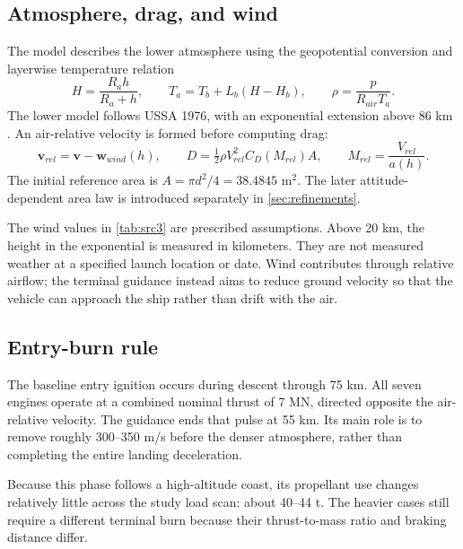 \documentclass[11pt,a4paper]{article}
\newcommand{\vect}[1]{\bm{#1}}
\begin{document}
\subsection{Atmosphere, drag, and wind}
The model describes the lower atmosphere using the geopotential conversion and layerwise temperature relation
\begin{equation}
 H=\frac{R_ah}{R_a+h},\qquad
 T_a=T_b+L_b(H-H_b),\qquad \rho=\frac{p}{R_{air}T_a}.
\label{eq:atmo}
\end{equation}
The lower model follows USSA 1976, with an exponential extension above 86 km \cite{ussa}. An air-relative velocity is formed before computing drag:
\begin{equation}
 \vect v_{rel}=\vect v-\vect w_{wind}(h),\qquad
 D=\tfrac12\rho V_{rel}^2C_D(M_{rel})A,\qquad
 M_{rel}=\frac{V_{rel}}{a(h)}.
\end{equation}
The initial reference area is $A=\pi d^2/4=38.4845$ m$^2$. The later attitude-dependent area law is introduced separately in \cref{sec:refinements}.



The wind values in \cref{tab:src3} are prescribed assumptions. Above 20 km, the height in the exponential is measured in kilometers. They are not measured weather at a specified launch location or date. Wind contributes through relative airflow; the terminal guidance instead aims to reduce ground velocity so that the vehicle can approach the ship rather than drift with the air.

\subsection{Entry-burn rule}
The baseline entry ignition occurs during descent through 75 km. All seven engines operate at a combined nominal thrust of 7 MN, directed opposite the air-relative velocity. The guidance ends that pulse at 55 km. Its main role is to remove roughly 300--350 m/s before the denser atmosphere, rather than completing the entire landing deceleration.

Because this phase follows a high-altitude coast, its propellant use changes relatively little across the study load scan: about 40--44 t. The heavier cases still require a different terminal burn because their thrust-to-mass ratio and braking distance differ.
\end{document}

